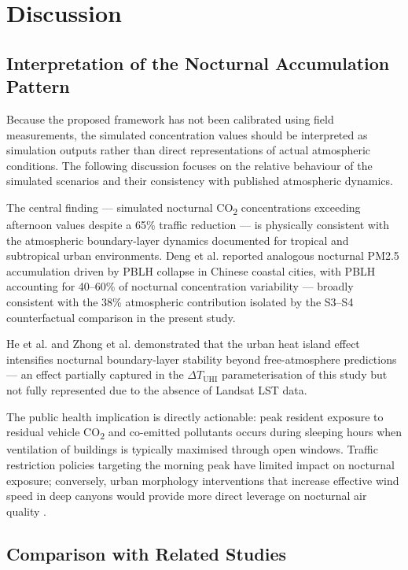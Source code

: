 \documentclass[12pt,a4paper]{article}
\begin{document}
\section{Discussion}

\subsection{Interpretation of the Nocturnal Accumulation Pattern}

Because the proposed framework has not been calibrated using field measurements, the simulated concentration values should be interpreted as simulation outputs rather than direct representations of actual atmospheric conditions. The following discussion focuses on the relative behaviour of the simulated scenarios and their consistency with published atmospheric dynamics.

The central finding --- simulated nocturnal CO\textsubscript{2} concentrations exceeding afternoon values despite a 65\% traffic reduction --- is physically consistent with the atmospheric boundary-layer dynamics documented for tropical and subtropical urban environments. Deng et al. \cite{Deng2023} reported analogous nocturnal PM2.5 accumulation driven by PBLH collapse in Chinese coastal cities, with PBLH accounting for 40--60\% of nocturnal concentration variability --- broadly consistent with the 38\% atmospheric contribution isolated by the S3--S4 counterfactual comparison in the present study.

He et al. \cite{He2019} and Zhong et al. \cite{Zhong2021} demonstrated that the urban heat island effect intensifies nocturnal boundary-layer stability beyond free-atmosphere predictions --- an effect partially captured in the $\Delta T_\mathrm{UHI}$ parameterisation of this study but not fully represented due to the absence of Landsat LST data.

The public health implication is directly actionable: peak resident exposure to residual vehicle CO\textsubscript{2} and co-emitted pollutants occurs during sleeping hours when ventilation of buildings is typically maximised through open windows. Traffic restriction policies targeting the morning peak have limited impact on nocturnal exposure; conversely, urban morphology interventions that increase effective wind speed in deep canyons would provide more direct leverage on nocturnal air quality \cite{GromkeRuck2007,Vardoulakis2003}.

\subsection{Comparison with Related Studies}
\end{document}
